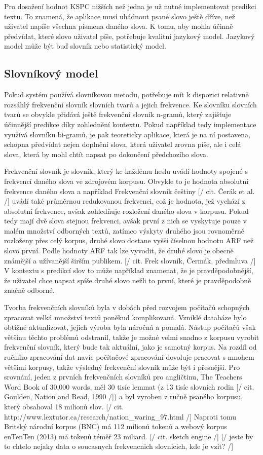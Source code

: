 \documentclass{article}
\begin{document}
Pro dosažení hodnot KSPC nižších než jedna je už nutné implementovat predikci textu. To znamená, že aplikace musí uhádnout psané slovo ještě dříve, než uživatel napíše všechna písmena daného slova. K tomu, aby mohla účinně předvídat, které slovo uživatel píše, potřebuje kvalitní jazykový model. Jazykový model může být buď slovník nebo statistický model. 

\subsection{Slovníkový model}

Pokud systém používá slovníkovou metodu, potřebuje mít k dispozici relativně rozsáhlý frekvenční slovník slovních tvarů a jejich frekvence. Ke slovníku slovních tvarů se obvykle přidává ještě frekvenční slovník n-gramů, který zajišťuje účinnější predikce díky zohlednění kontextu. Pokud například tedy implementace využívá slovníku bi-gramů, je pak teoreticky aplikace, která je na ní postavena, schopna předvídat nejen doplnění slova, která uživatel zrovna píše, ale i celá slova, která by mohl chtít napsat po dokončení předchozího slova.

Frekvenční slovník je slovník, který ke každému heslu uvádí hodnoty spojené s frekvencí daného slova ve zdrojovém korpusu. Obvykle to je hodnota absolutní frekvence daného slova a například Frekvenční slovník češtiny [/ cit. Čerák et al. /] uvádí také průměrnou redukovanou frekvenci, což je hodnota, jež vychází z absolutní frekvence, avšak zohledňuje rozložení daného slova v korpusu. Pokud tedy mají dvě slova stejnou frekvenci, avšak první z nich se vyskytuje pouze v malém množství odborných textů, zatímco výskyty druhého jsou rovnoměrně rozloženy přes celý korpus, druhé slovo dostane vyšší číselnou hodnotu ARF než slovo první. Podle hodnoty ARF tak lze vyvodit, že druhé slovo je obecně známější a užívanější širším publikem. [/ cit. Frek slovník, Čermák, předmluva /] V kontextu s predikcí slov to může například znamenat, že je pravděpodobnější, že uživatel chce napsat spíše druhé slovo nežli to první, které je pravděpodobně značně odborné.

Tvorba frekvenčních slovníků byla v dobách před rozvojem počítačů schopných zpracovat velká množství textů poněkud komplikovaná. Vzniklé databáze bylo obtížné aktualizovat, jejich výroba byla náročná a pomalá. Nástup počítačů však většinu těchto problémů odstranil, takže je možné velmi snadno z korpusu vyrobit frekvenční slovník, který bude tak aktuální, jako je samotný korpus. Na rozdíl od ručního zpracování dat navíc počítačové zpracování dovoluje pracovat s mnohem většími korpusy, takže výsledný frekvenční slovník může být i přesnější. Pro srovnání, jeden z prvních frekvenčních slovníků pro angličtinu, The Teachers Word Book of 30,000 words, měl 30 tisíc lemmat (z 13 tisíc slovních rodin [/ cit. Goulden, Nation and Read, 1990 /]) a byl vyroben z ručně psaného korpusu, který obsahoval 18 milionů slov. [/ cit. http://www.lextutor.ca/research/nation_waring_97.html /] Naproti tomu Britský národní korpus (BNC) má 112 milionů tokenů a webový korpus enTenTen (2013) má tokenů téměř 23 miliard. [/ cit. sketch engine /] [/ jeste by to chtelo nejaky data o soucasnych frekvencnich slovnicich, kde je vzit? /]
\end{document}
